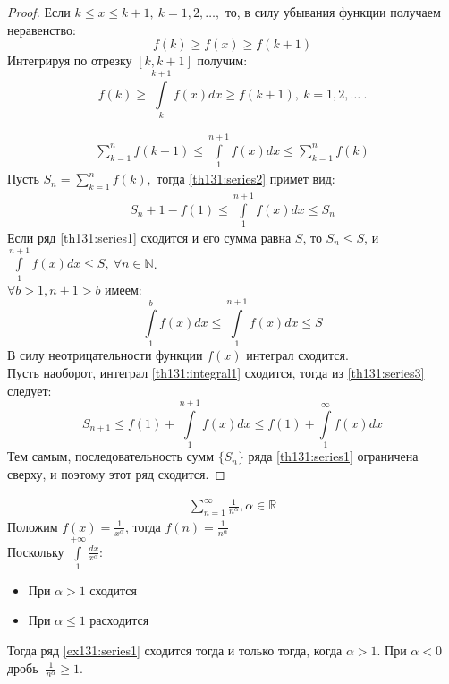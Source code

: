 \begin{proof}
  Если $k \leq x \leq k + 1, \ k = 1, 2, \dots,$ то, в силу убывания функции
  получаем неравенство:
  $$f(k) \geq f(x) \geq f(k + 1)$$
  Интегрируя по отрезку $[k, k + 1]$ получим:
  $$f(k) \geq \int\limits_k^{k+1} f(x) dx \geq f(k+1), \ k = 1, 2, \dots \ .$$

  \begin{gather}
    \label{th131:series2}
    \sum\limits_{k = 1}^{n} f(k+1) \leq \int\limits_1^{n+1} f(x) dx \leq
    \sum\limits_{k = 1}^{n} f(k)
  \end{gather}
  Пусть $S_n = \sum\limits_{k = 1}^{n} f(k),$ тогда \eqref{th131:series2} примет вид:
  \begin{gather}
    \label{th131:series3}
    S_n + 1 - f(1) \leq \int\limits_1^{n+1} f(x) dx \leq S_n
  \end{gather}
  Если ряд \eqref{th131:series1} сходится и его сумма равна $S$, то $S_n \leq S$,
  и $\int\limits_1^{n+1} f(x) dx \leq S, \ \forall n \in \mathbb{N}$. \\
  $\forall b > 1, n + 1 > b$ имеем:
  $$\int\limits_1^b f(x) dx \leq \int\limits_1^{n+1} f(x) dx \leq S$$
  В силу неотрицательности функции $f(x)$ интеграл сходится. \\
  Пусть наоборот, интеграл \eqref{th131:integral1} сходится, тогда из
  \eqref{th131:series3} следует:
  $$S_{n+1} \leq f(1) + \int\limits_1^{n+1} f(x) dx
  \leq f(1) + \int\limits_1^\infty f(x) dx$$
  Тем самым, последовательность сумм $\{S_n\}$ ряда \eqref{th131:series1}
  ограничена сверху, и поэтому этот ряд сходится.
\end{proof}

\begin{example}
  \label{th131:example131}
  \begin{gather}
    \label{ex131:series1}
    \sum\limits_{n = 1}^{\infty} \frac{1}{n^\alpha}, \alpha \in \mathbb{R}
  \end{gather}
  Положим $f(x) = \frac{1}{x^\alpha}$, тогда $f(n) = \frac{1}{n^\alpha}$ \\
  Поскольку $\int\limits_1^{+\infty} \frac{dx}{x^\alpha}$:
  \begin{itemize}
    \item При $\alpha > 1$ сходится
    \item При $\alpha \leq 1$ расходится
  \end{itemize}
  Тогда ряд \eqref{ex131:series1} сходится тогда и только тогда, когда $\alpha > 1$.
  При $\alpha < 0 \ $ дробь $ \ \frac{1}{n^\alpha} \geq 1$.
\end{example}

